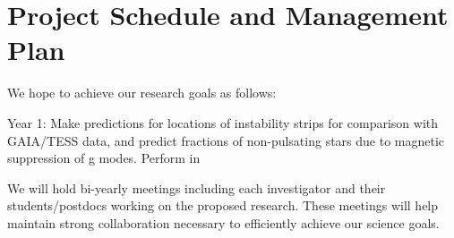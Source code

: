 \section{Project Schedule and Management Plan}

We hope to achieve our research goals as follows:

Year 1: Make predictions for locations of instability strips for comparison with GAIA/TESS data, and predict fractions of non-pulsating stars due to magnetic suppression of g modes. Perform in  

We will  hold bi-yearly meetings including each investigator and their students/postdocs working on the proposed research. These meetings will help maintain strong collaboration necessary to efficiently achieve our science goals.
